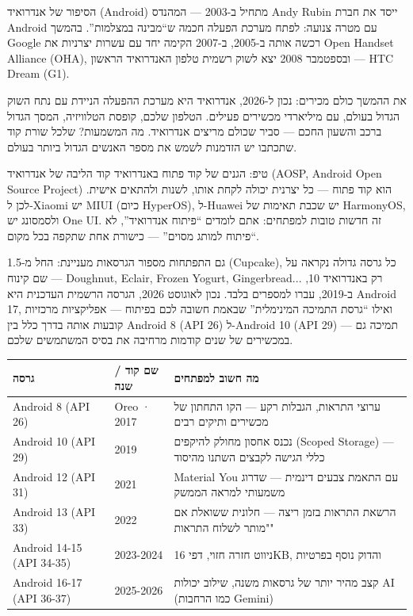 


הסיפור של אנדרואיד (Android) מתחיל ב-2003 — המהנדס Andy Rubin ייסד את חברת Android עם מטרה צנועה: לפתח מערכת הפעלה חכמה ש“מבינה במצלמות”. בהמשך Google רכשה אותה ב-2005, ב-2007 הקימה יחד עם עשרות יצרניות את Open Handset Alliance (OHA), ובספטמבר 2008 יצא לשוק רשמית טלפון האנדרואיד הראשון — HTC Dream (G1).

את ההמשך כולם מכירים: נכון ל-2026, אנדרואיד היא מערכת ההפעלה הניידת עם נתח השוק הגדול בעולם, עם מיליארדי מכשירים פעילים. הטלפון שלכם, קופסת הטלוויזיה, המסך הגדול ברכב והשעון החכם — סביר שכולם מריצים אנדרואיד. מה המשמעות? שלכל שורת קוד שתכתבו יש הזדמנות לשמש את מספר האנשים הגדול ביותר בעולם.

\begin{tcbinfo}{טיפ: הגנים של קוד פתוח באנדרואיד}
קוד הליבה של אנדרואיד (AOSP, Android Open Source Project) הוא קוד פתוח — כל יצרנית יכולה לקחת אותו, לשנות ולהתאים אישית. לכן ל-Xiaomi יש MIUI (כיום HyperOS), ל-Huawei יש שכבת תאימות של HarmonyOS, ולסמסונג יש One UI. זה חדשות טובות למפתחים: אתם לומדים “פיתוח אנדרואיד”, לא “פיתוח למותג מסוים” — כישורת אחת שתקפה בכל מקום.

\end{tcbinfo}

גם התפתחות מספור הגרסאות מעניינת: החל מ-1.5 (Cupcake), כל גרסה גדולה נקראה על שם קינוח — Doughnut, Eclair, Frozen Yogurt, Gingerbread... רק באנדרואיד 10, ב-2019, עברו למספרים בלבד. נכון לאוגוסט 2026, הגרסה הרשמית העדכנית היא Android 17, ואילו “גרסת התמיכה המינימלית” שבאמת חשובה לכם בפיתוח — אפליקציות מרכזיות קובעות אותה בדרך כלל בין Android 8 (API 26) ל-Android 10 (API 29) — תמיכה גם במכשירים של שנים קודמות מרחיבה את בסיס המשתמשים שלכם.

\begin{center}
\begin{tabularx}{\linewidth}{|X|X|X|}
\hline
\textbf{גרסה} & \textbf{שם קוד / שנה} & \textbf{מה חשוב למפתחים} \tabularnewline
\hline
Android 8 (API 26) & Oreo · 2017 & ערוצי התראות, הגבלות רקע — הקו התחתון של מכשירים ותיקים רבים \tabularnewline
Android 10 (API 29) & 2019 & נכנס אחסון מחולק להיקפים (Scoped Storage) — כללי הגישה לקבצים השתנו מהיסוד \tabularnewline
Android 12 (API 31) & 2021 & Material You עם התאמת צבעים דינמית — שדרוג משמעותי למראה הממשק \tabularnewline
Android 13 (API 33) & 2022 & הרשאת התראות בזמן ריצה — חלונית ששואלת אם "מותר לשלוח התראות" \tabularnewline
Android 14-15 (API 34-35) & 2023-2024 & ניווט חזרה חזוי, דפי 16KB, והדוק נוסף בפרטיות \tabularnewline
Android 16-17 (API 36-37) & 2025-2026 & קצב מהיר יותר של גרסאות משנה, שילוב יכולות AI (כמו הרחבות Gemini) \tabularnewline
\hline
\end{tabularx}
\end{center}

